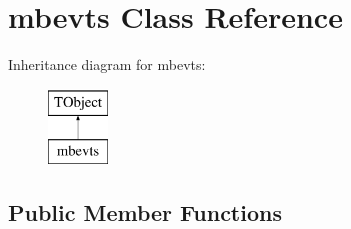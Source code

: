 \hypertarget{classmbevts}{}\section{mbevts Class Reference}
\label{classmbevts}
Inheritance diagram for mbevts\+:\begin{figure}[H]
\begin{center}
\leavevmode
\includegraphics[height=2.000000cm]{classmbevts}
\end{center}
\end{figure}
\subsection*{Public Member Functions}
